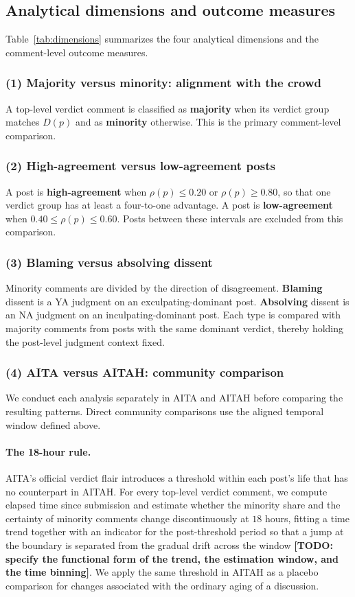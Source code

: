 \subsection{Analytical dimensions and outcome measures}
\label{subsec:method}

Table~\ref{tab:dimensions} summarizes the four analytical dimensions and the
comment-level outcome measures.


\subsubsection*{(1) Majority versus minority: alignment with the crowd}
A top-level verdict comment is classified as \textbf{majority} when its verdict
group matches $D(p)$ and as \textbf{minority} otherwise. This is the primary
comment-level comparison.

\subsubsection*{(2) High-agreement versus low-agreement posts}
A post is \textbf{high-agreement} when $\rho(p)\le 0.20$ or
$\rho(p)\ge 0.80$, so that one verdict group has at least a four-to-one
advantage. A post is \textbf{low-agreement} when
$0.40\le\rho(p)\le 0.60$. Posts between these intervals are excluded from this
comparison.

\subsubsection*{(3) Blaming versus absolving dissent}
Minority comments are divided by the direction of disagreement.
\textbf{Blaming} dissent is a YA judgment on an exculpating-dominant post.
\textbf{Absolving} dissent is an NA judgment on an inculpating-dominant post.
Each type is compared with majority comments from posts with the same dominant
verdict, thereby holding the post-level judgment context fixed.

\subsubsection*{(4) AITA versus AITAH: community comparison}
We conduct each analysis separately in AITA and AITAH before comparing the
resulting patterns. Direct community comparisons use the aligned temporal window
defined above.

\paragraph{The 18-hour rule.}
AITA's official verdict flair introduces a threshold within each post's life
that has no counterpart in AITAH. For every top-level verdict comment, we
compute elapsed time since submission and estimate whether the minority share
and the certainty of minority comments change discontinuously at $18$ hours,
fitting a time trend together with an indicator for the post-threshold period
so that a jump at the boundary is separated from the gradual drift across the
window \textbf{[TODO: specify the functional form of the trend, the estimation
window, and the time binning]}. We apply the same threshold in AITAH as a placebo comparison
for changes associated with the ordinary aging of a discussion.

